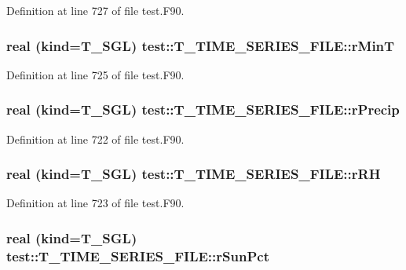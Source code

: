 Definition at line 727 of file test.F90.

\hypertarget{typetest_1_1_t___t_i_m_e___s_e_r_i_e_s___f_i_l_e_a277d6f205ff7105aa099671bc6bcb645}{
\subsubsection[{rMinT}]{\setlength{\rightskip}{0pt plus 5cm}real (kind={\bf T\_\-SGL}) {\bf test::T\_\-TIME\_\-SERIES\_\-FILE::rMinT}}}
\label{typetest_1_1_t___t_i_m_e___s_e_r_i_e_s___f_i_l_e_a277d6f205ff7105aa099671bc6bcb645}


Definition at line 725 of file test.F90.

\hypertarget{typetest_1_1_t___t_i_m_e___s_e_r_i_e_s___f_i_l_e_a9b16b0e46a33aa55f66a6ee4105e7be5}{
\subsubsection[{rPrecip}]{\setlength{\rightskip}{0pt plus 5cm}real (kind={\bf T\_\-SGL}) {\bf test::T\_\-TIME\_\-SERIES\_\-FILE::rPrecip}}}
\label{typetest_1_1_t___t_i_m_e___s_e_r_i_e_s___f_i_l_e_a9b16b0e46a33aa55f66a6ee4105e7be5}


Definition at line 722 of file test.F90.

\hypertarget{typetest_1_1_t___t_i_m_e___s_e_r_i_e_s___f_i_l_e_a57f4233be721cd6d4d61f5c90c161c9e}{
\subsubsection[{rRH}]{\setlength{\rightskip}{0pt plus 5cm}real (kind={\bf T\_\-SGL}) {\bf test::T\_\-TIME\_\-SERIES\_\-FILE::rRH}}}
\label{typetest_1_1_t___t_i_m_e___s_e_r_i_e_s___f_i_l_e_a57f4233be721cd6d4d61f5c90c161c9e}


Definition at line 723 of file test.F90.

\hypertarget{typetest_1_1_t___t_i_m_e___s_e_r_i_e_s___f_i_l_e_a53074457d40b13272137b9e2347db9a5}{
\subsubsection[{rSunPct}]{\setlength{\rightskip}{0pt plus 5cm}real (kind={\bf T\_\-SGL}) {\bf test::T\_\-TIME\_\-SERIES\_\-FILE::rSunPct}}}
\label{typetest_1_1_t___t_i_m_e___s_e_r_i_e_s___f_i_l_e_a53074457d40b13272137b9e2347db9a5}


